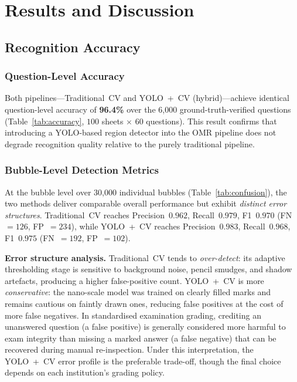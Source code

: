 \documentclass[conference]{IEEEtran}
\begin{document}
\section{Results and Discussion}

\subsection{Recognition Accuracy}
\label{sec:results-recognition}

\subsubsection{Question-Level Accuracy}

Both pipelines---Traditional~CV and YOLO~+~CV (hybrid)---achieve
identical question-level accuracy of \textbf{96.4\%} over the 6{,}000
ground-truth-verified questions (Table~\ref{tab:accuracy},
$100$ sheets $\times$ $60$ questions).
This result confirms that introducing a YOLO-based region detector
into the OMR pipeline does not degrade recognition quality relative
to the purely traditional pipeline.

\subsubsection{Bubble-Level Detection Metrics}

At the bubble level over 30{,}000 individual bubbles
(Table~\ref{tab:confusion}), the two methods deliver comparable
overall performance but exhibit \emph{distinct error structures}.
Traditional~CV reaches Precision~$0.962$, Recall~$0.979$,
F1~$0.970$ (FN~$=126$, FP~$=234$), while YOLO~+~CV reaches
Precision~$\mathbf{0.983}$, Recall~$0.968$, F1~$\mathbf{0.975}$
(FN~$=192$, FP~$=102$).

\textbf{Error structure analysis.}
Traditional~CV tends to \emph{over-detect}: its adaptive thresholding
stage is sensitive to background noise, pencil smudges, and shadow
artefacts, producing a higher false-positive count.
YOLO~+~CV is more \emph{conservative}: the nano-scale model was
trained on clearly filled marks and remains cautious on faintly drawn
ones, reducing false positives at the cost of more false negatives.
In standardised examination grading, crediting an unanswered question
(a false positive) is generally considered more harmful to exam
integrity than missing a marked answer (a false negative) that can be
recovered during manual re-inspection.
Under this interpretation, the YOLO~+~CV error profile is the
preferable trade-off, though the final choice depends on each
institution's grading policy.
\end{document}
